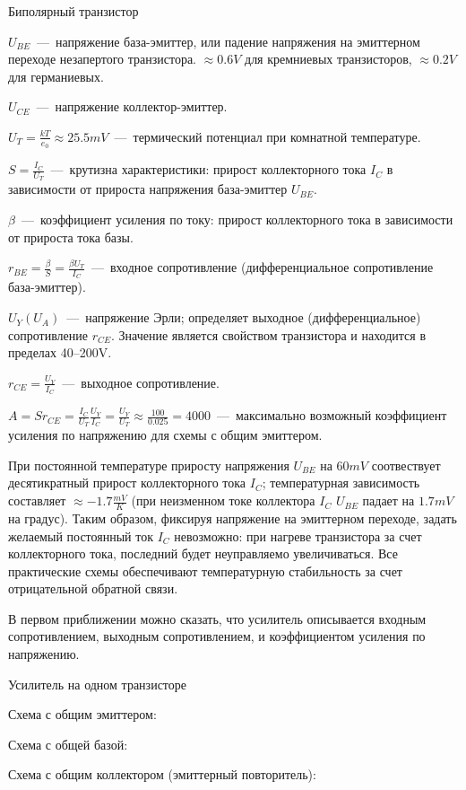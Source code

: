 \documentclass[
a4paper
,11pt
,landscape
,russian
,twocolumn
]{letter}
\begin{document}
\thispagestyle{empty}

\begin{Large}
Биполярный транзистор
\end{Large}

\vspace{.2in}

$U_{BE}$~---~напряжение база-эмиттер, или падение напряжения на
эмиттерном переходе незапертого транзистора. $\approx 0.6V$ для
кремниевых транзисторов, $\approx 0.2V$ для германиевых.

$U_{CE}$~---~напряжение коллектор-эмиттер.

$U_T=\frac{kT}{e_0}\approx 25.5mV$~---~термический потенциал при
комнатной температуре.

$S=\frac{I_C}{U_T}$~---~крутизна характеристики: прирост коллекторного
тока $I_C$ в зависимости от прироста напряжения база-эмиттер $U_{BE}$.

$\beta$~---~коэффициент усиления по току: прирост
коллекторного тока в зависимости от прироста тока базы.

$r_{BE}=\frac{\beta}{S}=\frac{\beta U_T}{I_C}$~---~входное сопротивление
(дифференциальное сопротивление база-эмиттер).

$U_Y(U_A)$~---~напряжение Эрли; определяет выходное (дифференциальное)
сопротивление $r_{CE}$. Значение является свойством транзистора и
находится в пределах 40--200V.

$r_{CE}=\frac{U_Y}{I_C}$~---~выходное сопротивление.

$A=Sr_{CE}=\frac{I_C}{U_T}\frac{U_Y}{I_C}=\frac{U_Y}{U_T}
\approx\frac{100}{0.025}=4000$~---~максимально возможный
коэффициент усиления по напряжению для схемы с общим эмиттером.

\vspace{.2in}

При постоянной температуре приросту напряжения $U_{BE}$ на $60mV$
соотвествует десятикратный прирост коллекторного тока $I_C$;
температурная зависимость составляет $\approx -1.7\frac{mV}{K}$
(при неизменном токе коллектора $I_C$ $U_{BE}$ падает на
$1.7mV$ на градус). Таким образом, фиксируя напряжение на
эмиттерном переходе, задать желаемый постоянный ток $I_C$
невозможно: при нагреве транзистора за счет коллекторного
тока, последний будет неуправляемо увеличиваться. Все практические
схемы обеспечивают температурную стабильность за счет
отрицательной обратной связи.

В первом приближении можно сказать, что усилитель описывается
входным сопротивлением, выходным сопротивлением, и коэффициентом
усиления по напряжению.

\vspace{.2in}

\begin{Large}
Усилитель на одном транзисторе
\end{Large}

\vspace{.2in}

Схема с общим эмиттером:

Схема с общей базой:

Схема с общим коллектором (эмиттерный повторитель):
\end{document}
